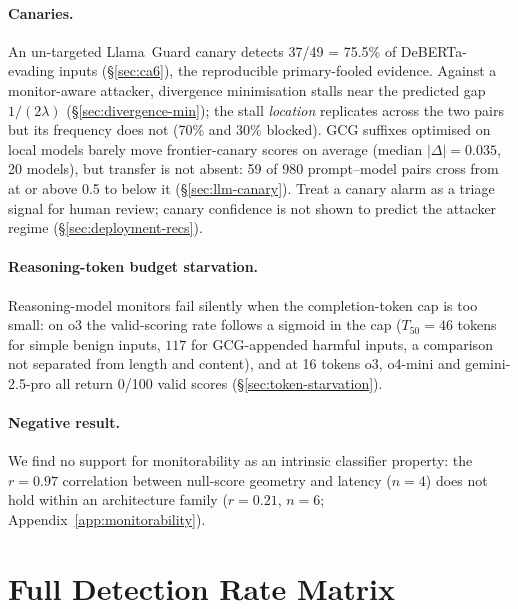 \documentclass{article}
\begin{document}
\paragraph{Canaries.} An un-targeted Llama~Guard canary detects 37/49 = 75.5\% of DeBERTa-evading inputs (\S\ref{sec:ca6}), the reproducible primary-fooled evidence. Against a monitor-aware attacker, divergence minimisation stalls near the predicted gap $1/(2\lambda)$ (\S\ref{sec:divergence-min}); the stall \emph{location} replicates across the two pairs but its frequency does not (70\% and 30\% blocked). GCG suffixes optimised on local models barely move frontier-canary scores on average (median $|\Delta| = 0.035$, 20 models), but transfer is not absent: 59 of 980 prompt--model pairs cross from at or above 0.5 to below it (\S\ref{sec:llm-canary}). Treat a canary alarm as a triage signal for human review; canary confidence is not shown to predict the attacker regime (\S\ref{sec:deployment-recs}).

\paragraph{Reasoning-token budget starvation.} Reasoning-model monitors fail silently when the completion-token cap is too small: on o3 the valid-scoring rate follows a sigmoid in the cap ($T_{50}=46$ tokens for simple benign inputs, $117$ for GCG-appended harmful inputs, a comparison not separated from length and content), and at 16 tokens o3, o4-mini and gemini-2.5-pro all return 0/100 valid scores (\S\ref{sec:token-starvation}).

\paragraph{Negative result.} We find no support for monitorability as an intrinsic classifier property: the $r = 0.97$ correlation between null-score geometry and latency ($n = 4$) does not hold within an architecture family ($r = 0.21$, $n = 6$; Appendix~\ref{app:monitorability}).




\appendix
\section{Full Detection Rate Matrix}
\label{app:detection-rates}
\end{document}
